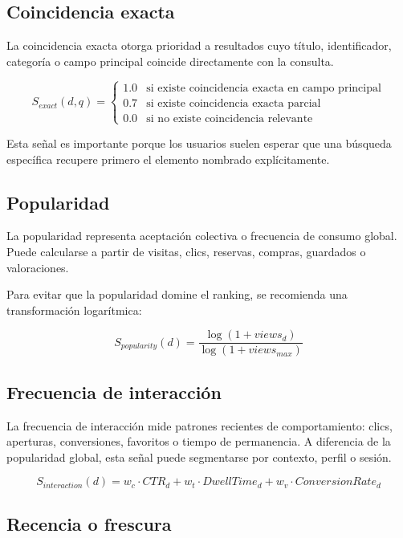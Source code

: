 \documentclass[12pt,a4paper]{article}
\begin{document}
\subsection{Coincidencia exacta}

La coincidencia exacta otorga prioridad a resultados cuyo título, identificador, categoría o campo principal coincide directamente con la consulta.

\[
S_{exact}(d,q) =
\begin{cases}
1.0 & \text{si existe coincidencia exacta en campo principal}\\
0.7 & \text{si existe coincidencia exacta parcial}\\
0.0 & \text{si no existe coincidencia relevante}
\end{cases}
\]

Esta señal es importante porque los usuarios suelen esperar que una búsqueda específica recupere primero el elemento nombrado explícitamente.

\subsection{Popularidad}

La popularidad representa aceptación colectiva o frecuencia de consumo global. Puede calcularse a partir de visitas, clics, reservas, compras, guardados o valoraciones.

Para evitar que la popularidad domine el ranking, se recomienda una transformación logarítmica:

\[
S_{popularity}(d) = \frac{\log(1 + views_d)}{\log(1 + views_{max})}
\]

\subsection{Frecuencia de interacción}

La frecuencia de interacción mide patrones recientes de comportamiento: clics, aperturas, conversiones, favoritos o tiempo de permanencia. A diferencia de la popularidad global, esta señal puede segmentarse por contexto, perfil o sesión.

\[
S_{interaction}(d) = w_c \cdot CTR_d + w_t \cdot DwellTime_d + w_v \cdot ConversionRate_d
\]

\subsection{Recencia o frescura}
\end{document}
